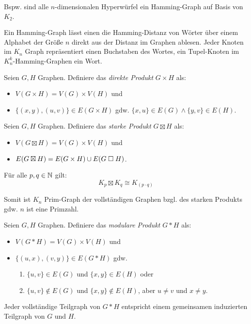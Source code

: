 \begin{remark}
    Bspw. sind alle $ n $-dimensionalen Hyperwürfel ein Hamming-Graph auf Basis von $ K_2 $.

    Ein Hamming-Graph lässt einen die Hamming-Distanz von Wörter über einem Alphabet der Größe $ n $ direkt aus der Distanz im Graphen ablesen.
    Jeder Knoten im $ K_n $ Graph repräsentiert einen Buchstaben des Wortes, ein Tupel-Knoten im $ K_n^k $-Hamming-Graphen ein Wort.
\end{remark}

\begin{definition}
    Seien $ G, H $ Graphen.
    Definiere das \textit{direkte Produkt} $ G \times H $ als:
    \begin{itemize}
        \item $ V(G \times H) = V(G) \times V(H) $ und
        \item $ \{ (x, y), (u, v) \} \in E(G \times H) $ gdw. $ \{ x, u\} \in E(G) \land \{ y, v \} \in E(H) $.
    \end{itemize}
\end{definition}

\begin{definition}
    Seien $ G, H $ Graphen.
    Definiere das \textit{starke Produkt} $ G \boxtimes H $ als:
    \begin{itemize}
        \item $ V(G \boxtimes H) = V(G) \times V(H) $ und
        \item $ E(G \boxtimes H) = E(G \times H) \cup E(G \mathrel{\square} H) $.
    \end{itemize}
\end{definition}

\begin{proposition}
    Für alle $ p, q \in \mathbb{N} $ gilt:
    \begin{equation*}
        K_p \boxtimes K_q \cong K_{(p \cdot q)}
    \end{equation*}

    Somit ist $ K_n $ Prim-Graph der vollständigen Graphen bzgl. des starken Produkts gdw. $ n $ ist eine Primzahl.
\end{proposition}

\begin{definition}
    Seien $ G, H $ Graphen.
    Definiere das \textit{modulare Produkt} $ G * H $ als:
    \begin{itemize}
        \item $ V(G * H) = V(G) \times V(H) $ und
        \item $ \{ (u, x), (v, y) \} \in E(G * H) $ gdw.
        \begin{enumerate}
            \item $ \{ u, v \} \in E(G) $ und $ \{ x, y \} \in E(H) $ oder
            \item $ \{ u, v \} \notin E(G) $ und $ \{ x, y \} \notin E(H) $, aber $ u \ne v $ und $ x \ne y $.
        \end{enumerate}
    \end{itemize}
\end{definition}

\begin{remark}
    Jeder vollständige Teilgraph von $ G * H $ entspricht einem gemeinsamen induzierten Teilgraph von $ G $ und $ H $.
\end{remark}
